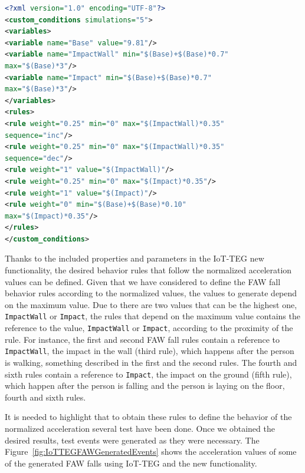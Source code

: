 \documentclass[review]{elsarticle}
\begin{document}
\begin{lstlisting}[basicstyle=\ttfamily\footnotesize,language=XML,caption={Rules to define a FAW fall},label=FAWFallRules]
<?xml version="1.0" encoding="UTF-8"?>
<custom_conditions simulations="5">
<variables>
<variable name="Base" value="9.81"/>
<variable name="ImpactWall" min="$(Base)+$(Base)*0.7" 
max="$(Base)*3"/>
<variable name="Impact" min="$(Base)+$(Base)*0.7" 
max="$(Base)*3"/>
</variables>
<rules>
<rule weight="0.25" min="0" max="$(ImpactWall)*0.35" 
sequence="inc"/>
<rule weight="0.25" min="0" max="$(ImpactWall)*0.35" 
sequence="dec"/>
<rule weight="1" value="$(ImpactWall)"/>
<rule weight="0.25" min="0" max="$(Impact)*0.35"/>
<rule weight="1" value="$(Impact)"/>
<rule weight="0" min="$(Base)+$(Base)*0.10"
max="$(Impact)*0.35"/>
</rules>
</custom_conditions>
\end{lstlisting}

Thanks to the included properties and parameters in the IoT-TEG new functionality, the desired behavior rules that
follow the normalized acceleration values can be defined. Given that we have considered to define the FAW fall behavior
rules according to the normalized values, the values to generate depend on the maximum value. Due to there are two 
values that can be the highest one, \texttt{ImpactWall} or \texttt{Impact}, the rules that depend on the maximum 
value contains the reference to the value, \texttt{ImpactWall} or \texttt{Impact}, according to the proximity
of the rule. For instance, the first and second FAW fall rules contain a reference to \texttt{ImpactWall}, the impact 
in the wall (third rule), which happens after the person is walking, something described in the first and the second rules.
The fourth and sixth rules contain a reference to \texttt{Impact}, the impact on the ground (fifth rule), which happen
after the person is falling and the person is laying on the floor, fourth and sixth rules.

It is needed to highlight that to obtain these rules to define the behavior of the normalized acceleration several test have been done. Once we obtained the desired results, test events were generated as they were necessary. The Figure~\ref{fig:IoTTEGFAWGeneratedEvents} shows the acceleration values of some of the generated FAW falls using IoT-TEG and the new functionality.
\end{document}
